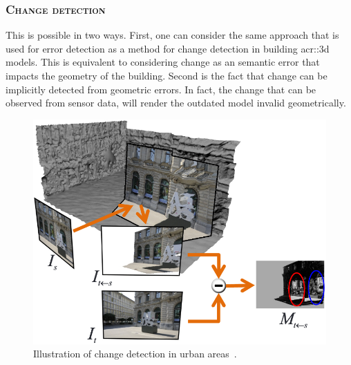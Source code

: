         \subsubsection{\textsc{Change detection}}
            This is possible in two ways.
            First, one can consider the same approach that is used for error detection as a method for change detection in building \gls{acr::3d} models.
            This is equivalent to considering change as an semantic error that impacts the geometry of the building.
            Second is the fact that change can be implicitly detected from geometric errors.
            In fact, the change that can be observed from sensor data, will render the outdated model invalid geometrically.
            \begin{figure}[htpb]
                \centering
                \includegraphics[width=.7\textwidth]{images/introduction/use/change_detection_taneja}
                \caption{\label{fig::3d_change_detection} Illustration of change detection in urban areas~\parencite{taneja2013city}.}
            \end{figure}

